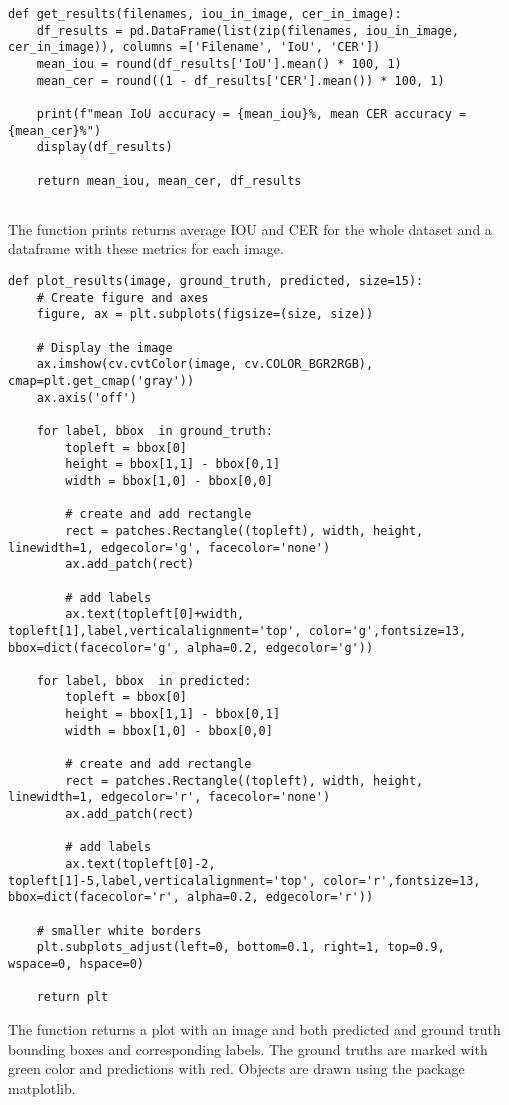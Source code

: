 \begin{lstlisting}[caption=get\_results]
def get_results(filenames, iou_in_image, cer_in_image):
    df_results = pd.DataFrame(list(zip(filenames, iou_in_image, cer_in_image)), columns =['Filename', 'IoU', 'CER'])
    mean_iou = round(df_results['IoU'].mean() * 100, 1)
    mean_cer = round((1 - df_results['CER'].mean()) * 100, 1)
    
    print(f"mean IoU accuracy = {mean_iou}%, mean CER accuracy = {mean_cer}%")
    display(df_results)
    
    return mean_iou, mean_cer, df_results
    
\end{lstlisting}

The function  prints returns average IOU and CER for the whole dataset and a dataframe with these metrics for each image.


\begin{lstlisting}[caption=plot\_results]
def plot_results(image, ground_truth, predicted, size=15):
    # Create figure and axes
    figure, ax = plt.subplots(figsize=(size, size))

    # Display the image
    ax.imshow(cv.cvtColor(image, cv.COLOR_BGR2RGB), cmap=plt.get_cmap('gray'))
    ax.axis('off')

    for label, bbox  in ground_truth:
        topleft = bbox[0]
        height = bbox[1,1] - bbox[0,1]
        width = bbox[1,0] - bbox[0,0]

        # create and add rectangle
        rect = patches.Rectangle((topleft), width, height, linewidth=1, edgecolor='g', facecolor='none')
        ax.add_patch(rect)

        # add labels
        ax.text(topleft[0]+width, topleft[1],label,verticalalignment='top', color='g',fontsize=13, bbox=dict(facecolor='g', alpha=0.2, edgecolor='g'))

    for label, bbox  in predicted:
        topleft = bbox[0]
        height = bbox[1,1] - bbox[0,1]
        width = bbox[1,0] - bbox[0,0]

        # create and add rectangle
        rect = patches.Rectangle((topleft), width, height, linewidth=1, edgecolor='r', facecolor='none')
        ax.add_patch(rect)

        # add labels
        ax.text(topleft[0]-2, topleft[1]-5,label,verticalalignment='top', color='r',fontsize=13, bbox=dict(facecolor='r', alpha=0.2, edgecolor='r'))
    
    # smaller white borders
    plt.subplots_adjust(left=0, bottom=0.1, right=1, top=0.9, wspace=0, hspace=0)

    return plt 
\end{lstlisting}

The function  returns a plot with an image and both predicted and ground truth bounding boxes 
and corresponding labels. The ground truths are marked with green color and predictions with red. Objects are drawn using the package matplotlib.
